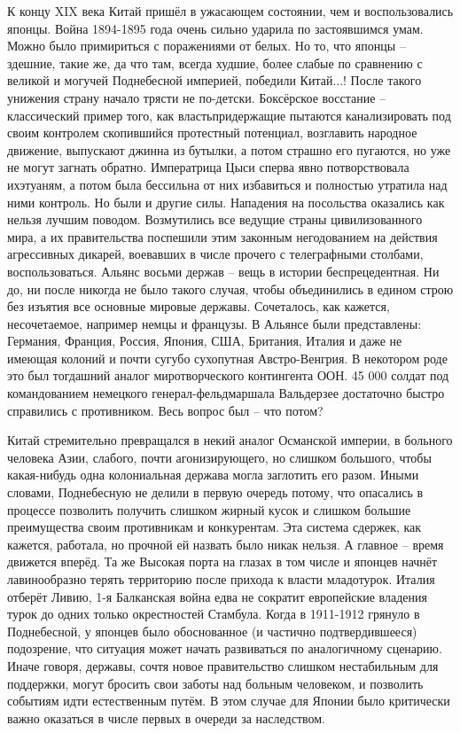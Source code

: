 К концу XIX века Китай пришёл в ужасающем состоянии, чем и воспользовались японцы. Война 1894-1895 года очень сильно ударила по застоявшимся умам. Можно было примириться с поражениями от белых. Но то, что японцы – здешние, такие же, да что там, всегда худшие, более слабые по сравнению с великой и могучей Поднебесной империей, победили Китай...! После такого унижения страну начало трясти не по-детски. Боксёрское восстание – классический пример того, как властьпридержащие пытаются канализировать под своим контролем скопившийся протестный потенциал, возглавить народное движение, выпускают джинна из бутылки, а потом страшно его пугаются, но уже не могут загнать обратно. Императрица Цыси сперва явно потворствовала ихэтуаням, а потом была бессильна от них избавиться и полностью утратила над ними контроль. Но были и другие силы. Нападения на посольства оказались как нельзя лучшим поводом. Возмутились все ведущие страны цивилизованного мира, а их правительства поспешили этим законным негодованием на действия агрессивных дикарей, воевавших в числе прочего с телеграфными столбами, воспользоваться. Альянс восьми держав – вещь в истории беспрецедентная. Ни до, ни после никогда не было такого случая, чтобы объединились в едином строю без изъятия все основные мировые державы. Сочеталось, как кажется, несочетаемое, например немцы и французы. В Альянсе были представлены: Германия, Франция, Россия, Япония, США, Британия, Италия и даже не имеющая колоний и почти сугубо сухопутная Австро-Венгрия. В некотором роде это был тогдашний аналог миротворческого контингента ООН. 45 000 солдат под командованием немецкого генерал-фельдмаршала Вальдерзее достаточно быстро справились с противником. Весь вопрос был – что потом?

Китай стремительно превращался в некий аналог Османской империи, в больного человека Азии, слабого, почти агонизирующего, но слишком большого, чтобы какая-нибудь одна колониальная держава могла заглотить его разом. Иными словами, Поднебесную не делили в первую очередь потому, что опасались в процессе позволить получить слишком жирный кусок и слишком большие преимущества своим противникам и конкурентам. Эта система сдержек, как кажется, работала, но прочной ей назвать было никак нельзя. А главное – время движется вперёд. Та же Высокая порта на глазах в том числе и японцев начнёт лавинообразно терять территорию после прихода к власти младотурок. Италия отберёт Ливию, 1-я Балканская война едва не сократит европейские владения турок до одних только окрестностей Стамбула. Когда в 1911-1912 грянуло в Поднебесной, у японцев было обоснованное (и частично подтвердившееся) подозрение, что ситуация может начать развиваться по аналогичному сценарию. Иначе говоря, державы, сочтя новое правительство слишком нестабильным для поддержки, могут бросить свои заботы над больным человеком, и позволить событиям идти естественным путём. В этом случае для Японии было критически важно оказаться в числе первых в очереди за наследством.

